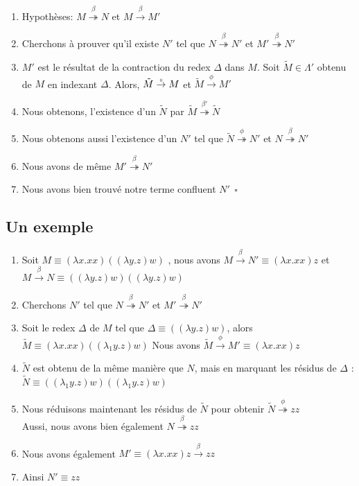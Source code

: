 \documentclass[11pt]{book}
\begin{document}
\begin{enumerate}
	\item Hypothèses: $M\stackrel{\beta}{\twoheadrightarrow} N$ et
                    $M\stackrel{\beta}{\rightarrow} M'$        
       \item Cherchons à prouver qu'il existe $N'$ tel que  $N\stackrel{\beta}{\twoheadrightarrow} N'$ 
et  $M' \stackrel{\beta}{\twoheadrightarrow} N'$ 
        \item $M'$ est le résultat de la contraction du redex $\Delta$ dans $M$. Soit $\tilde{M} \in \Lambda '$
        obtenu de $M$ en indexant $\Delta$. Alors, $ \tilde{M} \stackrel{\shortparallel}{\rightarrow} M$ et 
       $ \tilde{M} \stackrel{\phi}{\rightarrow} M'$ 
       \item Nous obtenons, l'existence d'un $\tilde{N}$ par $\tilde{M}\stackrel{\beta '}\twoheadrightarrow \tilde{N}$
       \item Nous obtenons aussi l'existence d'un $N'$ tel que $\tilde{N} \stackrel{\phi}{\twoheadrightarrow} N'$
       et $N \stackrel{\beta}{\twoheadrightarrow} N'$
       \item Nous avons de même $M' \stackrel{\beta}{\twoheadrightarrow} N'$
       \item Nous avons bien trouvé notre terme confluent $N'\ \  \square $

\end{enumerate}

\subsection{Un exemple}
\begin{enumerate}
	\item Soit $M \equiv (\lambda x.xx)((\lambda y.z)w)$ , nous avons 
	$M \stackrel{\beta}{\rightarrow} N' \equiv (\lambda x.xx)z$ et $M \stackrel{\beta}{\rightarrow} N \equiv ((\lambda y.z)w)((\lambda y.z)w)$
       \item Cherchons  $N'$ tel que  $N\stackrel{\beta}{\twoheadrightarrow} N'$ 
et  $M' \stackrel{\beta}{\twoheadrightarrow} N'$ 
	\item  Soit le redex $\Delta$ de $M$ tel que $\Delta \equiv ((\lambda y.z)w)$, alors $\tilde{M} \equiv (\lambda x.xx)((\lambda_1 y.z)w)$
	Nous avons $\tilde{M}  \stackrel{\phi}{\rightarrow} M' \equiv (\lambda x.xx)z$
	\item $\tilde{N}$ est obtenu de la même manière que $N$, mais en marquant les résidus de $\Delta$ :
	 $\tilde{N} \equiv  ((\lambda _1 y.z)w)((\lambda _1 y.z)w)$

	 \item  Nous réduisons maintenant les résidus de $\tilde{N}$ pour obtenir
	  $\tilde{N}  \stackrel{\phi}{\twoheadrightarrow} zz$ \\
	  Aussi, nous avons bien également $N \stackrel{\beta}{\twoheadrightarrow} zz$

	 \item Nous avons également $M' \equiv (\lambda x.xx)z \stackrel{\beta}{\rightarrow} zz$
	 \item Ainsi $N' \equiv zz$
\end{enumerate}
\end{document}
